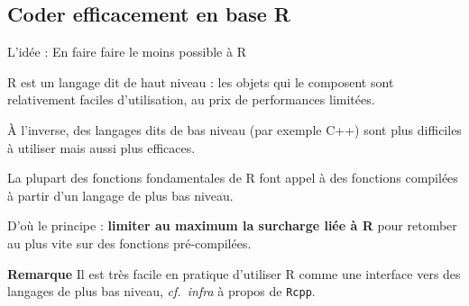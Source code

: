 \documentclass[12pt,ignorenonframetext,]{beamer}
\newcommand{\intertitre}[1]{\textcolor{redInsee}{\textbf{#1}}}
\begin{document}
\hypertarget{coder-efficacement-en-base-r}{%
\subsection{Coder efficacement en base
R}\label{coder-efficacement-en-base-r}}

\begin{frame}[fragile]{L’idée : En faire faire le moins possible à R}
\protect\hypertarget{lidee-en-faire-faire-le-moins-possible-a-r}{}

R est un langage dit \og de haut niveau \fg{} : les objets qui le
composent sont relativement faciles d’utilisation, au prix de
performances limitées.

\vfill

À l’inverse, des langages dits de \og bas niveau \fg{} (par exemple C++)
sont plus difficiles à utiliser mais aussi plus efficaces.

\vfill

\pause La plupart des fonctions fondamentales de R font appel à des
fonctions compilées à partir d’un langage de plus bas niveau.

\vfill

D’où le principe : \textbf{limiter au maximum la surcharge liée à R}
pour retomber au plus vite sur des fonctions pré-compilées.

\pause \vfill

\intertitre{Remarque} Il est très facile en pratique d’utiliser R comme
une interface vers des langages de plus bas niveau, \emph{cf.~infra} à
propos de \texttt{Rcpp}.

\end{frame}
\end{document}
